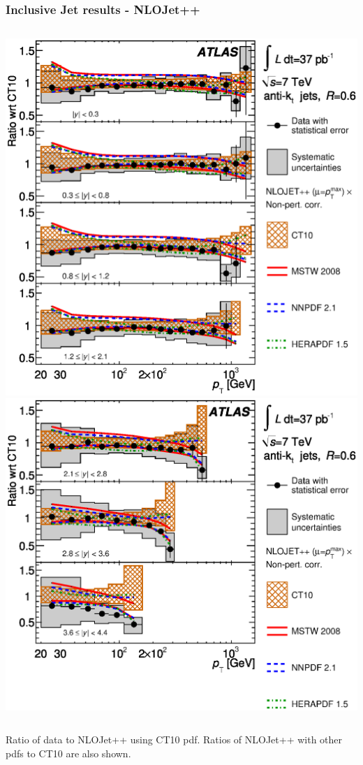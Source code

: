 \documentclass[10pt]{beamer}
\begin{document}
\begin{frame} 
\frametitle{Inclusive Jet results - NLOJet++}
\begin{columns}
\includegraphics[width=1.0\linewidth,angle=0]{inclusive_results/figs_new/fig_12c_inc_ratio_akt6_central.eps}
\includegraphics[width=1.0\linewidth,angle=0]{inclusive_results/figs_new/fig_12d_inc_ratio_akt6_forward.eps}
\end{columns}
Ratio of data to NLOJet++ using CT10 pdf. Ratios of NLOJet++ with other pdfs to CT10 are also shown.
\end{frame}
\end{document}
